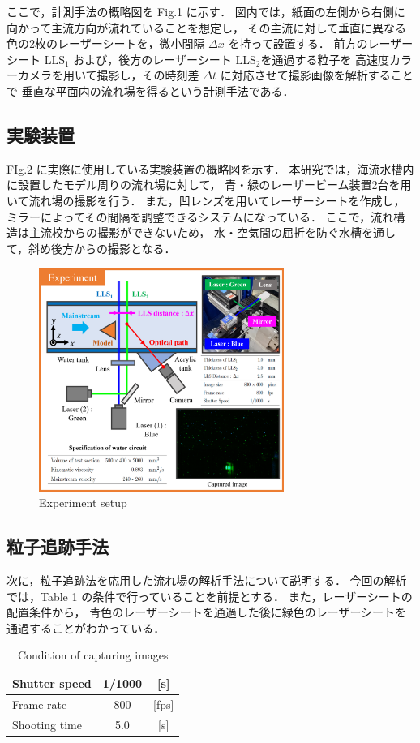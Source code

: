 \documentclass[twocolumn,a4j]{jsarticle}
\begin{document}
\newpage
ここで，計測手法の概略図を Fig.1 に示す．
図内では，紙面の左側から右側に向かって主流方向が流れていることを想定し，
その主流に対して垂直に異なる色の2枚のレーザーシートを，微小間隔 $\Delta x$ を持って設置する．
前方のレーザーシート LLS$_1$ および，後方のレーザーシート LLS$_2$を通過する粒子を
高速度カラーカメラを用いて撮影し，その時刻差 $\Delta t$ に対応させて撮影画像を解析することで
垂直な平面内の流れ場を得るという計測手法である．

\subsection{実験装置}

FIg.2 に実際に使用している実験装置の概略図を示す．
本研究では，海流水槽内に設置したモデル周りの流れ場に対して，
青・緑のレーザービーム装置2台を用いて流れ場の撮影を行う．
また，凹レンズを用いてレーザーシートを作成し，
ミラーによってその間隔を調整できるシステムになっている．
ここで，流れ構造は主流校からの撮影ができないため，
水・空気間の屈折を防ぐ水槽を通して，斜め後方からの撮影となる．

\begin{figure}[htbp]
	\centering
	\includegraphics[keepaspectratio, width=80mm]{../images/experiment.png}
	\caption{Experiment setup}
\end{figure}

\newpage
\subsection{粒子追跡手法}
次に，粒子追跡法を応用した流れ場の解析手法について説明する．
今回の解析では，Table 1 の条件で行っていることを前提とする．
また，レーザーシートの配置条件から，
青色のレーザーシートを通過した後に緑色のレーザーシートを通過することがわかっている．
\begin{table}[hbtp]
	\centering
	\caption{Condition of capturing images}
	\begin{tabular}{l c c}
		\hline
		Shutter speed & 1/1000 & [s]   \\ \hline
		Frame rate    & 800    & [fps] \\ \hline
		Shooting time & 5.0    & [s]   \\ \hline
	\end{tabular}
\end{table}
\end{document}

